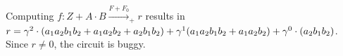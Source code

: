 \begin{Example}
{Computing $f: Z + A\cdot  B\xrightarrow{F+F_{0}}_+r$ results in $r =
 \gamma^2\cdot (a_1a_2b_1b_2+a_1a_2b_2+a_2b_1b_2) +
 \gamma^1(a_1a_2b_1b_2+a_1a_2b_2) + \gamma^0 \cdot (a_2b_1b_2)$. Since $r\neq 0$,
 the circuit is buggy.  
}
\end{Example}


